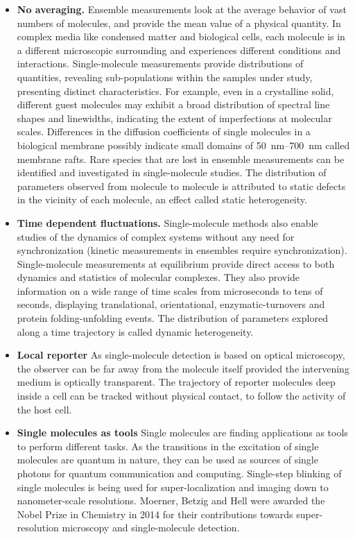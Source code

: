 \begin{itemize}
	\item \textbf{No averaging.} Ensemble measurements look at the average behavior of vast numbers of molecules, and provide the mean value of a physical quantity.
	In complex media like condensed matter and biological cells, each molecule is in a different microscopic surrounding and experiences different conditions and interactions.
	Single-molecule measurements provide distributions of quantities, revealing sub-populations within the samples under study, presenting distinct characteristics.
	For example, even in a crystalline solid, different guest molecules may exhibit a broad distribution of spectral line shapes and linewidths, indicating the extent of imperfections at molecular scales.\cite{kozankiewicz1994single,reilly1993spectral}
	Differences in the diffusion coefficients of single molecules in a biological membrane possibly indicate small domains of \SIrange{50}{700}{\nm} called membrane rafts.\cite{lommerse2004singlemolecule}
	Rare species that are lost in ensemble measurements can be identified and investigated in single-molecule studies.
	The distribution of parameters observed from molecule to molecule is attributed to static defects in the vicinity of each molecule, an effect called static heterogeneity.
	\item \textbf{Time dependent fluctuations.} Single-molecule methods also enable studies of the dynamics of complex systems without any need for synchronization (kinetic measurements in ensembles require synchronization).
	Single-molecule measurements at equilibrium provide direct access to both dynamics and statistics of molecular complexes.
	They also provide information on a wide range of time scales from microseconds to tens of seconds, displaying translational, orientational, enzymatic-turnovers and protein folding-unfolding events.\cite{schmidt1996imaging,ruiter1997single,lu1998single-molecule,schuler2002probing}
	The distribution of parameters explored along a time trajectory is called dynamic heterogeneity.
	\item \textbf{Local reporter} As single-molecule detection is based on optical microscopy, the observer can be far away from the molecule itself provided the intervening medium is optically transparent. The trajectory of reporter molecules deep inside a cell can be tracked without physical contact, to follow the activity of the host cell.
	\item \textbf{Single molecules as tools} Single molecules are finding applications as tools to perform different tasks. As the transitions in the excitation of single molecules are quantum in nature, they can be used as sources of single photons for quantum communication and computing.\cite{lounis2000single,lounis2005singlephoton}
	Single-step blinking of single molecules is being used for super-localization and imaging down to nanometer-scale resolutions.\cite{park2003superresolution,huang2008threedimensional}
	Moerner, Betzig and Hell were awarded the Nobel Prize in Chemistry in 2014 for their contributions towards super-resolution microscopy and single-molecule detection.
\end{itemize}

